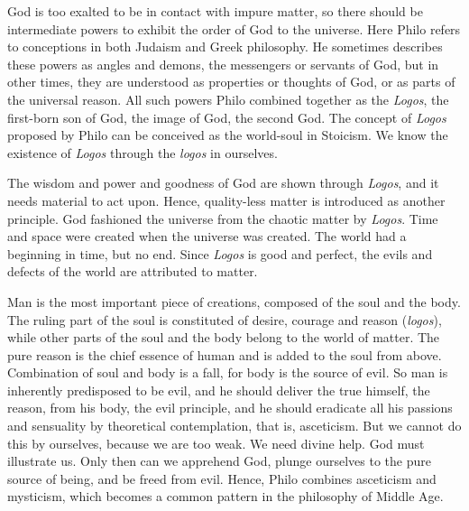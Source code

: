 \documentclass[11pt]{article}
\begin{document}
\newline

God is too exalted to be in contact with impure matter, so there should be intermediate powers to exhibit the order of God to the universe. 
Here Philo refers to conceptions in both Judaism and Greek philosophy. 
He sometimes describes these powers as angles and demons, the messengers or servants of God, but in other times, they are understood as properties or thoughts of God, or as parts of the universal reason. 
All such powers Philo combined together as the \textit{Logos}, the first-born son of God, the image of God, the second God. 
The concept of \textit{Logos} proposed by Philo can be conceived as the world-soul in Stoicism. 
We know the existence of \textit{Logos} through the \textit{logos} in ourselves.

\newline

The wisdom and power and goodness of God are shown through \textit{Logos}, and it needs material to act upon. 
Hence, quality-less matter is introduced as another principle. 
God fashioned the universe from the chaotic matter by \textit{Logos}. 
Time and space were created when the universe was created. 
The world had a beginning in time, but no end. 
Since \textit{Logos} is good and perfect, the evils and defects of the world are attributed to matter.

\newline

Man is the most important piece of creations, composed of the soul and the body. 
The ruling part of the soul is constituted of desire, courage and reason (\textit{logos}), while other parts of the soul and the body belong to the world of matter. 
The pure reason is the chief essence of human and is added to the soul from above. 
Combination of soul and body is a fall, for body is the source of evil. 
So man is inherently predisposed to be evil, and he should deliver the true himself, the reason, from his body, the evil principle, and he should eradicate all his passions and sensuality by theoretical contemplation, that is, asceticism. 
But we cannot do this by ourselves, because we are too weak. 
We need divine help. 
God must illustrate us. 
Only then can we apprehend God, plunge ourselves to the pure source of being, and be freed from evil. 
Hence, Philo combines asceticism and mysticism, which becomes a common pattern in the philosophy of Middle Age.
  
\end{document}
